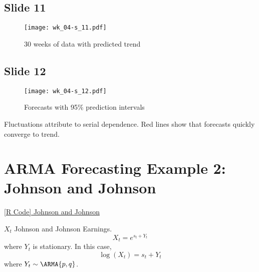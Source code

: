 \subsection*{Slide 11}
\begin{figure}[H]
    \centering
    \texttt{[image: wk\_04-s\_11.pdf]}
    \caption{30 weeks of data with predicted trend}
\end{figure}

\subsection*{Slide 12}
\begin{figure}[H]
    \centering
    \texttt{[image: wk\_04-s\_12.pdf]}
    \caption{Forecasts with 95\% prediction intervals}
\end{figure}
Fluctuations attribute to serial dependence. Red lines
show that forecasts quickly converge to trend.


\section{ARMA Forecasting Example 2: Johnson and Johnson}
\href{https://github.com/Hextical/university-notes/blob/master/year-3/semester-2/STAT%20443/code/4.6%20-%20Johnson%20and%20Johnson%20Forecasting.R}{[R Code] Johnson and Johnson}

$ X_t $ Johnson and Johnson Earnings.
\[ X_t=e^{s_t+Y_t} \]
where $ Y_t $ is stationary. In this case,
\[ \log(X_t)=s_t+Y_t \]
where $ Y_t \sim \ARMA{p,q} $.
